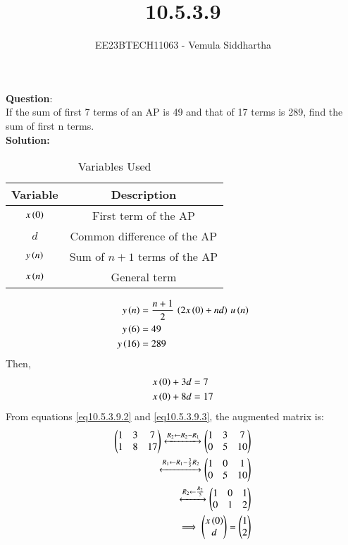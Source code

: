 \documentclass[journal,12pt,twocolumn]{IEEEtran}
\theoremstyle{remark}
\begin{document}

\vspace{3cm}

\title{10.5.3.9}
\author{EE23BTECH11063 - Vemula Siddhartha
}
\maketitle
\newpage
\bigskip

\renewcommand{\thefigure}{\theenumi}
\renewcommand{\thetable}{\theenumi}
\textbf{Question}:\\
If the sum of first 7 terms of an AP is 49 and that of 17 terms is 289, find the sum of
first n terms.
\\
\textbf{Solution: }
\begin{table}[h!]    
  \centering
  \begin{tabular}[12pt]{ |c| c|}
  \hline
  \textbf{Variable} & \textbf{Description}\\ 
  \hline
  $x\left(0\right)$ & First term of the AP \\
  \hline 
  $d$ & Common difference of the AP\\
  \hline
  $y\left(n\right)$ & Sum of $n+1$ terms of the AP\\
  \hline
  $x\left(n\right)$ & General term\\
  \hline   
  \end{tabular}
  \caption{Variables Used}
  \label{tab10.5.3.9.1}
\end{table}
\begin{align}
y\left(n\right)&=\frac{n+1}{2}\,\left(2x\left(0\right)+nd\right)\,u\left(n\right)\label{eq10.5.3.9.1}\\
y\left(6\right)&=49\\
y\left(16\right)&=289
\end{align}
Then,
\begin{align}
x\left(0\right)+3d&=7\label{eq10.5.3.9.2}\\
x\left(0\right)+8d&=17 \label{eq10.5.3.9.3}
\end{align}
From  equations \ref{eq10.5.3.9.2} and \ref{eq10.5.3.9.3}, the augmented matrix is:
\begin{align}
 \begin{pmatrix}
   1 & 3 & 7
   \\
   1 & 8 & 17
 \end{pmatrix}
 \xleftrightarrow[]{R_2 \leftarrow {R_2-R_1}}
 \begin{pmatrix}
   1 & 3 & 7
   \\
   0 & 5 & 10
 \end{pmatrix}
 \\
 \xleftrightarrow[]{R_1 \leftarrow {R_1-\frac{3}{5}R_2}}
 \begin{pmatrix}
   1 & 0 & 1
   \\
   0 & 5 & 10
 \end{pmatrix}
 \\
 \xleftrightarrow[]{R_2 \leftarrow \frac{R_2}{5}}
 \begin{pmatrix}
   1 & 0 & 1
   \\
   0 & 1 & 2
 \end{pmatrix}
 \\
 \implies \begin{pmatrix}
   x\left(0\right)
   \\
   d
 \end{pmatrix}
 =
 \begin{pmatrix}
   1
   \\
   2
 \end{pmatrix}
\end{align}
\end{document}
